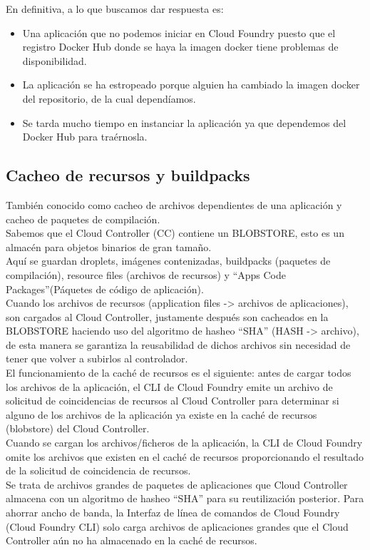 \documentclass[a4paper,11pt]{article}
\begin{document}
En definitiva, a lo que buscamos dar respuesta es:
\begin{itemize}
  \item Una aplicación que no podemos iniciar en Cloud Foundry puesto que el registro Docker Hub donde se haya la imagen docker tiene problemas de disponibilidad.
  \item La aplicación se ha estropeado porque alguien ha cambiado la imagen docker del repositorio, de la cual dependíamos.
  \item Se tarda mucho tiempo en instanciar la aplicación ya que dependemos del Docker Hub para traérnosla.
\end{itemize}

\subsection{Cacheo de recursos y buildpacks}
También conocido como cacheo de archivos dependientes de una aplicación y cacheo de paquetes de compilación.\\
Sabemos que el Cloud Controller (CC) contiene un BLOBSTORE, esto es un almacén para objetos binarios de gran tamaño.\\
Aquí se guardan droplets, imágenes contenizadas, buildpacks (paquetes de compilación), resource files (archivos de recursos) y “Apps Code Packages”(Páquetes de código de aplicación).\\
Cuando los archivos de recursos (application files -> archivos de aplicaciones), son cargados al Cloud Controller, justamente después son cacheados en la BLOBSTORE haciendo uso del algoritmo de hasheo “SHA” (HASH -> archivo), de esta manera se garantiza la reusabilidad de dichos archivos sin necesidad de tener que volver a subirlos al controlador.\\
El funcionamiento de la caché de recursos es el siguiente: antes de cargar todos los archivos de la aplicación, el CLI de Cloud Foundry emite un archivo de solicitud de coincidencias de recursos al Cloud Controller para determinar si alguno de los archivos de la aplicación ya existe en la caché de recursos (blobstore) del Cloud Controller.\\
Cuando se cargan los archivos/ficheros de la aplicación, la CLI de Cloud Foundry omite los archivos que existen en el caché de recursos proporcionando el resultado de la solicitud de coincidencia de recursos.\\
Se trata de archivos grandes de paquetes de aplicaciones que Cloud Controller almacena con un algoritmo de hasheo “SHA” para su reutilización posterior. Para ahorrar ancho de banda, la Interfaz de línea de comandos de Cloud Foundry (Cloud Foundry CLI) solo carga archivos de aplicaciones grandes que el Cloud Controller aún no ha almacenado en la caché de recursos.\\
\end{document}
